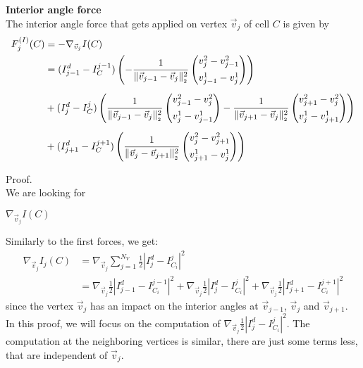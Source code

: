 \begin{proposition} \textbf{Interior angle force} \\

	The interior angle force that gets applied on vertex $\vec{v}_j$ of cell $C$ is given by 
	\begin{align}
		\begin{split}
			F^{(I)}_j(C) &= - \nabla_{\vec{v}_j} I(C)  \\
				&= (I_{j-1}^d - I^{j-1}_{C}) \left( 
					- \frac{1}{\norm[\vec{v}_{j-1} - \vec{v}_{j}]^2} \begin{pmatrix}
						v_{j}^2 - v_{j-1}^2 \\[0.5em]
						v_{j-1}^1 - v_{j}^1
					\end{pmatrix} 
				\right) \\[0.5em] 
			&+ (I_{j}^d - I^{j}_{C}) \left( 
				\frac{1}{\norm[\vec{v}_{j-1} - \vec{v}_j]^2} \begin{pmatrix}
				v_{j-1}^2 - v_{j}^2 \\[0.5em]
				v_{j}^1 - v_{j-1}^1
				\end{pmatrix} 
				- \frac{1}{\norm[\vec{v}_{j+1} - \vec{v}_j]^2} \begin{pmatrix}
				v_{j+1}^2 - v_{j}^2 \\[0.5em]
				v_{j}^1 - v_{j+1}^1
				\end{pmatrix} 
				\right) \\[0.5em] 
			&+ (I_{j+1}^d - I^{j+1}_{C}) \left( 
				\frac{1}{\norm[\vec{v}_{j} - \vec{v}_{j+1}]^2} \begin{pmatrix}
				v_{j}^2 - v_{j+1}^2 \\[0.5em]
				v_{j+1}^1 - v_{j}^1
				\end{pmatrix} 
				\right) %
		\end{split}
	\end{align}


	Proof. \\
	We are looking for 
	\begin{center}
		$
		\nabla_{\vec{v}_j} I(C)
		$
	\end{center}
	
	Similarly to the first forces, we get:
	\begin{align*}
		\nabla_{\vec{v}_j}  I_{j}(C) &=  \nabla_{\vec{v}_j} \sum\limits_{j=1}^{N_V} \frac{1}{2}| I_{j}^d - I^j_{C_i} |^2 \\
		&= \nabla_{\vec{v}_j} \frac{1}{2}| I_{j-1}^d - I^{j-1}_{C_i} |^2 
		+ \nabla_{\vec{v}_j} \frac{1}{2}| I_{j}^d - I^{j}_{C_i} |^2 
		+ \nabla_{\vec{v}_j} \frac{1}{2}| I_{j+1}^d - I^{j+1}_{C_i} |^2
	\end{align*}
	since the vertex $\vec{v}_j$ has an impact on the interior angles at $\vec{v}_{j-1}$, $\vec{v}_{j}$ and $\vec{v}_{j+1}$. \\
	In this proof, we will focus on the computation of $\nabla_{\vec{v}_j} \frac{1}{2}| I_{j}^d - I^{j}_{C_i} |^2$. 
	The computation at the neighboring vertices is similar, there are just some terms less, that are independent of $\vec{v}_j$.


\end{proposition}
